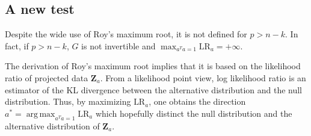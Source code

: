 \documentclass[12pt]{article} %
\DeclareMathOperator*{\argmax}{arg\,max}
\newcommand{\bZ}{\mathbf{Z}}
\theoremstyle{definition}
\begin{document}


\subsection{A new test}
Despite the wide use of Roy's maximum root, it is not defined for $p> n-k$.
In fact, if $p>n-k$, $G$ is not invertible and $\max_{a^T a=1}\text{LR}_a=+\infty$. 

The derivation of Roy's maximum root implies that it is based on the likelihood ratio of projected data $\bZ_a$.
From a likelihood point view, log likelihood ratio is an estimator of the KL divergence between the alternative distribution and the null distribution.
Thus, by maximizing $\text{LR}_a$, one obtains
the direction $a^*=\argmax_{a^T a=1}\text{LR}_a$ which hopefully distinct the null distribution and the alternative distribution of $\bZ_a$. 


\end{document}
